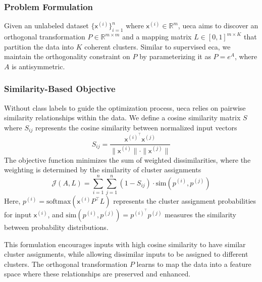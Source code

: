 \documentclass[lettersize,journal]{IEEEtran}
\begin{document}
\subsubsection{Problem Formulation}

Given an unlabeled dataset $\{\mathsf{x}^{(i)}\}_{i=1}^n$ where $\mathsf{x}^{(i)} \in \mathbb{R}^m$, \gls{ueca} aims to discover an orthogonal transformation $P \in \mathbb{R}^{m \times m}$ and a mapping matrix $L \in [0,1]^{m \times K}$ that partition the data into $K$ coherent clusters. Similar to supervised \gls{eca}, we maintain the orthogonality constraint on $P$ by parameterizing it as $P = e^A$, where $A$ is antisymmetric.

\subsubsection{Similarity-Based Objective}

Without class labels to guide the optimization process, \gls{ueca} relies on pairwise similarity relationships within the data. We define a cosine similarity matrix $S$ where $S_{ij}$ represents the cosine similarity between normalized input vectors
\begin{equation}
S_{ij} = \frac{\mathsf{x}^{(i)^{\top}} \mathsf{x}^{(j)}}{\|\mathsf{x}^{(i)}\| \cdot \|\mathsf{x}^{(j)}\|}
\end{equation}
The objective function minimizes the sum of weighted dissimilarities, where the weighting is determined by the similarity of cluster assignments
\begin{equation}
\mathcal{J}(A, L) = \sum_{i=1}^n \sum_{j=1}^n (1 - S_{ij}) \cdot \text{sim}(p^{(i)}, p^{(j)})
\end{equation}
Here, $p^{(i)} = \text{softmax}(\mathsf{x}^{(i)}P^{\top}  L)$ represents the cluster assignment probabilities for input $\mathsf{x}^{(i)}$, and $\text{sim}(p^{(i)}, p^{(j)}) = p^{(i)^{\top}} p^{(j)}$ measures the similarity between probability distributions.

This formulation encourages inputs with high cosine similarity to have similar cluster assignments, while allowing dissimilar inputs to be assigned to different clusters. The orthogonal transformation $P$ learns to map the data into a feature space where these relationships are preserved and enhanced.

\end{document}
